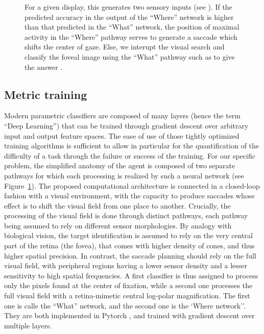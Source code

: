 \begin{figure}[t!]
{		\D
		For a given display, this generates two sensory inputs (see \B ).
		If the predicted accuracy in the output of the ``Where'' network is higher than that predicted in the ``What'' network, the position of maximal activity in the ``Where'' pathway serves to generate a saccade which shifts the center of gaze. Else, we interupt the visual search and classify the foveal image using the ``What'' pathway such as to give the answer \ANS . %
		\label{fig:methods}}%
\end{figure}%


\subsection{Metric training}

Modern parametric classifiers are composed of many layers (hence the term ``Deep Learning'') that can be trained through gradient descent over arbitrary input and output feature spaces. The ease of use of those tightly optimized training algorithms is sufficient to allow in particular for the quantification of the difficulty of a task through the failure or success of the training.
For our specific problem, the simplified anatomy of the agent is composed of two separate pathways for which each processing is realized by such a neural network (see Figure~\ref{fig:methods}). The proposed computational architecture is connected in a closed-loop fashion with a visual environment, with the capacity to produce saccades whose effect is to shift the visual field from one place to another. Crucially, the processing of the visual field is done through distinct pathways,  each pathway being assumed to rely on different sensor morphologies. By analogy with biological vision, the target identification is assumed to rely on the very central part of the retina (the fovea), that comes with higher density of cones, and thus higher spatial precision. In contrast, the  saccade planning should rely on the full visual field, with peripheral regions having a lower sensor density and a lesser sensitivity to high spatial frequencies. A first classifier is thus assigned to process only the pixels found at the center of fixation, while a second one processes the full visual field with a retina-mimetic central log-polar magnification.  The first one is calle the ``What'' network, and the second one is the `Where network''. They are both implemented in Pytorch \cite{NEURIPS2019_9015}, and trained with gradient descent over multiple layers.

